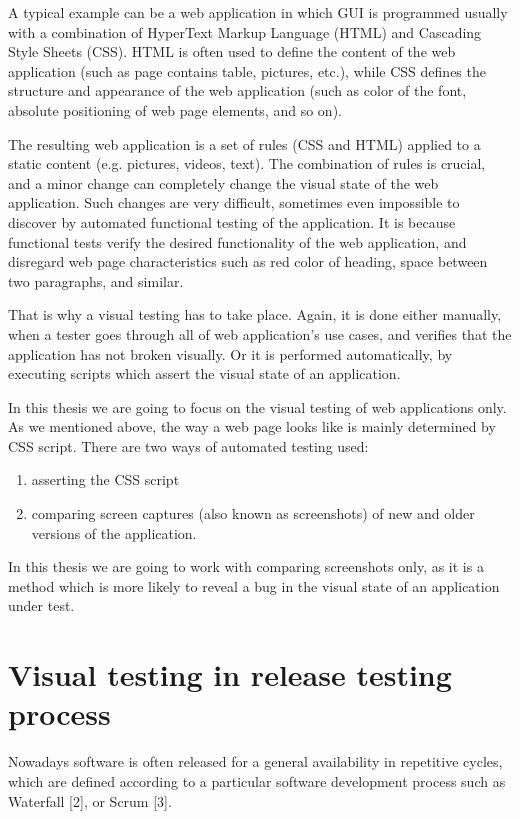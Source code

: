 \documentclass[11pt,oneside,final]{fithesis2}
\begin{document}
    A typical example can be a web application in which GUI is programmed usually with a combination of HyperText Markup Language (HTML) and Cascading Style Sheets (CSS). 
    HTML is often used to define the content of the web application (such as page contains table, pictures, etc.), while CSS defines the structure and appearance of the 
    web application (such as color of the font, absolute positioning of web page elements, and so on).
    
    The resulting web application is a set of rules (CSS and HTML) applied to a static content (e.g. pictures, videos, text). The combination of rules is crucial, and a minor change
    can completely change the visual state of the web application. Such changes are very difficult, sometimes even impossible to discover by automated functional testing of the application. 
    It is because functional tests verify the desired functionality of the web application, and disregard web page characteristics such as red color of heading, 
    space between two paragraphs, and similar.
    
    That is why a visual testing has to take place. Again, it is done either manually, when a tester goes through all of web application's use cases, and verifies that
    the application has not broken visually. Or it is performed automatically, by executing scripts which assert the visual state of an application.
    
    In this thesis we are going to focus on the visual testing of web applications only. As we mentioned above, the way a web page looks like is mainly determined by CSS script.
    There are two ways of automated testing used:
    \begin{enumerate}
      \item asserting the CSS script
      \item comparing screen captures (also known as screenshots) of new and older versions of the application.
    \end{enumerate}
    
    In this thesis we are going to work with comparing screenshots only, as it is a method which is more likely to reveal a bug
    in the visual state of an application under test.
     
  \section{Visual testing in release testing process}
  \label{sec:visual-testing-in-release-process}
  Nowadays software is often released for a general availability in repetitive cycles, which are defined according to a particular software development process
  such as Waterfall [2], or Scrum [3].
  
\end{document}
